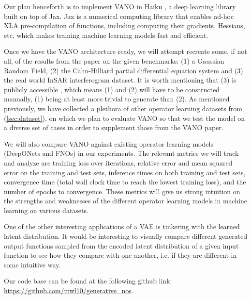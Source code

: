 \documentclass[11pt, fullpage,letterpaper]{article}
\begin{document}
Our plan henceforth is to implement VANO in Haiku \cite{haiku2020github}, a deep learning library built on top of Jax. Jax is a numerical computing library that enables ad-hoc XLA pre-compilation of functions, including computing their gradients, Hessians, etc, which makes training machine learning models fast and efficient.

Once we have the VANO architecture ready, we will attempt recreate some, if not all, of the results from the paper on the given benchmarks: (1) a Gaussian Random Field, (2) the Cahn-Hilliard partial differential equation system and (3) the real world InSAR interferogram dataset. It is worth mentioning that (3) is publicly accessible \cite{rahman2022generative}, which means (1) and (2) will have to be constructed manually, (1) being at least more trivial to generate than (2). As mentioned previously, we have collected a plethora of other operator learning datasets from \cite{Lu_2022} (\ref{sec:dataset}), on which we plan to evaluate VANO so that we test the model on a diverse set of cases in order to supplement those from the VANO paper. 


We will also compare VANO against existing operator learning models (DeepONets and FNOs) in our experiments. The relevant metrics we will track and analyze are training loss over iterations, relative error and mean squared error on the training and test sets, inference times on both training and test sets, convergence time (total wall clock time to reach the lowest training loss), and the number of epochs to convergence. These metrics will give us strong intuition on the strengths and weaknesses of the different operator learning models in machine learning on various datasets.

One of the other interesting applications of a VAE is tinkering with the learned latent distribution. It would be interesting to visually compare different generated output functions sampled from the encoded latent distribution of a given input function to see how they compare with one another, i.e. if they are different in some intuitive way.

Our code base can be found at the following github link: \url{https://github.com/mwl10/generative_nos}. 


\end{document}
